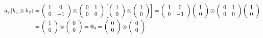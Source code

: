\documentclass[aps,preprint]{revtex4}%
\begin{document}
\begin{align}
a_{2}\left\vert h_{1}\otimes h_{2}\right\rangle  &  =\left(
\begin{array}
[c]{cc}%
1 & 0\\
0 & -1
\end{array}
\right)  \otimes\left(
\begin{array}
[c]{cc}%
0 & 1\\
0 & 0
\end{array}
\right)  \left[  \left(
\begin{array}
[c]{c}%
1\\
0
\end{array}
\right)  \otimes\left(
\begin{array}
[c]{c}%
1\\
0
\end{array}
\right)  \right]  =\left(
\begin{array}
[c]{cc}%
1 & 0\\
0 & -1
\end{array}
\right)  \left(
\begin{array}
[c]{c}%
1\\
0
\end{array}
\right)  \otimes\left(
\begin{array}
[c]{cc}%
0 & 1\\
0 & 0
\end{array}
\right)  \left(
\begin{array}
[c]{c}%
1\\
0
\end{array}
\right) \\
&  =\left(
\begin{array}
[c]{c}%
1\\
0
\end{array}
\right)  \otimes\left(
\begin{array}
[c]{c}%
0\\
0
\end{array}
\right)  =\mathbf{0}_{4}=\left(
\begin{array}
[c]{c}%
0\\
0
\end{array}
\right)  \otimes\left(
\begin{array}
[c]{c}%
0\\
0
\end{array}
\right)
\end{align}%
\end{document}
